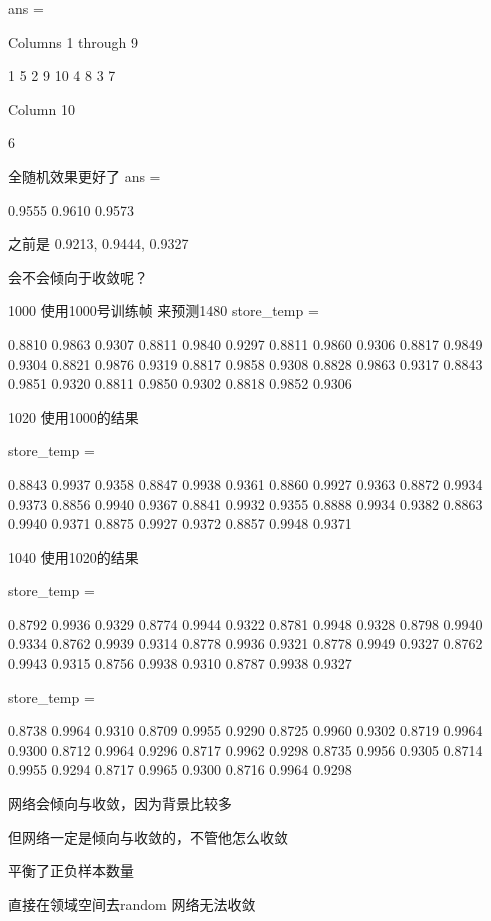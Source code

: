 ans =

  Columns 1 through 9

     1     5     2     9    10     4     8     3     7

  Column 10

     6


全随机效果更好了
ans =

    0.9555    0.9610    0.9573

之前是
0.9213, 0.9444, 0.9327


会不会倾向于收敛呢？

1000 使用1000号训练帧 来预测1480
store_temp =

    0.8810    0.9863    0.9307
    0.8811    0.9840    0.9297
    0.8811    0.9860    0.9306
    0.8817    0.9849    0.9304
    0.8821    0.9876    0.9319
    0.8817    0.9858    0.9308
    0.8828    0.9863    0.9317
    0.8843    0.9851    0.9320
    0.8811    0.9850    0.9302
    0.8818    0.9852    0.9306

1020 使用1000的结果

store_temp =

    0.8843    0.9937    0.9358
    0.8847    0.9938    0.9361
    0.8860    0.9927    0.9363
    0.8872    0.9934    0.9373
    0.8856    0.9940    0.9367
    0.8841    0.9932    0.9355
    0.8888    0.9934    0.9382
    0.8863    0.9940    0.9371
    0.8875    0.9927    0.9372
    0.8857    0.9948    0.9371

1040 使用1020的结果

store_temp =

    0.8792    0.9936    0.9329
    0.8774    0.9944    0.9322
    0.8781    0.9948    0.9328
    0.8798    0.9940    0.9334
    0.8762    0.9939    0.9314
    0.8778    0.9936    0.9321
    0.8778    0.9949    0.9327
    0.8762    0.9943    0.9315
    0.8756    0.9938    0.9310
    0.8787    0.9938    0.9327


store_temp =

    0.8738    0.9964    0.9310
    0.8709    0.9955    0.9290
    0.8725    0.9960    0.9302
    0.8719    0.9964    0.9300
    0.8712    0.9964    0.9296
    0.8717    0.9962    0.9298
    0.8735    0.9956    0.9305
    0.8714    0.9955    0.9294
    0.8717    0.9965    0.9300
    0.8716    0.9964    0.9298


网络会倾向与收敛，因为背景比较多

但网络一定是倾向与收敛的，不管他怎么收敛

平衡了正负样本数量


直接在领域空间去random 网络无法收敛
